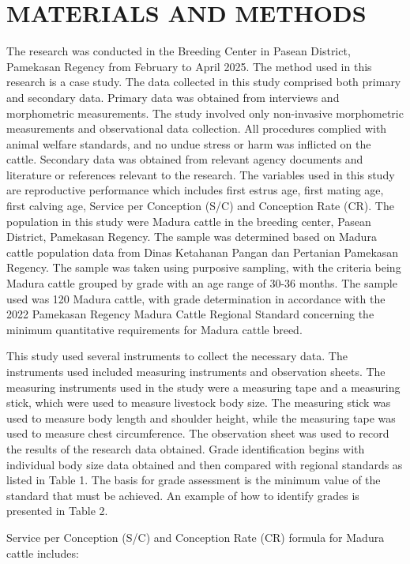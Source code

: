 \documentclass[9pt,article,twoside]{fapet-rho-class/fapet-rho}
\begin{document}
\section{MATERIALS AND METHODS}

The research was conducted in the Breeding Center in Pasean District, Pamekasan Regency from February to April 2025. The method used in this research is a case study. The data collected in this study comprised both primary and secondary data. Primary data was obtained from interviews and morphometric measurements. The study involved only non-invasive morphometric measurements and observational data collection. All procedures complied with animal welfare standards, and no undue stress or harm was inflicted on the cattle. Secondary data was obtained from relevant agency documents and literature or references relevant to the research. The variables used in this study are reproductive performance which includes first estrus age, first mating age, first calving age, Service per Conception (S/C) and Conception Rate (CR). The population in this study were Madura cattle in the breeding center, Pasean District, Pamekasan Regency. The sample was determined based on Madura cattle population data from Dinas Ketahanan Pangan dan Pertanian Pamekasan Regency. The sample was taken using purposive sampling, with the criteria being Madura cattle grouped by grade with an age range of 30-36 months. The sample used was 120 Madura cattle, with grade determination in accordance with the 2022 Pamekasan Regency Madura Cattle Regional Standard concerning the minimum quantitative requirements for Madura cattle breed.

This study used several instruments to collect the necessary data. The instruments used included measuring instruments and observation sheets. The measuring instruments used in the study were a measuring tape and a measuring stick, which were used to measure livestock body size. The measuring stick was used to measure body length and shoulder height, while the measuring tape was used to measure chest circumference. The observation sheet was used to record the results of the research data obtained. Grade identification begins with individual body size data obtained and then compared with regional standards as listed in Table 1. The basis for grade assessment is the minimum value of the standard that must be achieved. An example of how to identify grades is presented in Table 2.

Service per Conception (S/C) and Conception Rate (CR) formula for Madura cattle includes:
\end{document}
